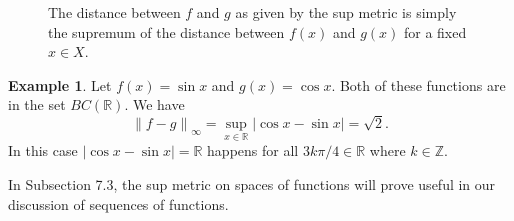 \documentclass{article}
\newcommand{\R}{\mathbb{R}}
\newcommand{\Z}{\mathbb{Z}}
\newcommand{\norm}[1]{\left\lVert#1\right\rVert}
\theoremstyle{definition}
\newtheorem{example}{Example}[section]
\begin{document}
	\begin{figure}[h!]
		\centering
		\caption{The distance between $ f $ and $ g $ as given by the sup metric is simply the supremum of the distance between $ f(x) $ and $ g(x) $ for a fixed $ x\in X $.}
	\end{figure}
	\begin{example}
		Let $ f(x)=\sin x $ and $ g(x)=\cos x $. Both of these functions are in the set $ BC(\R) $. We have $$\norm{f-g}_\infty=\sup_{x\in\R}|\cos x-\sin x|=\sqrt{2} .$$ In this case $ |\cos x-\sin x|=\R $ happens for all $ 3k\pi/4\in\R $ where $ k\in\Z $. 
	\end{example}
	
	In Subsection 7.3, the sup metric on spaces of functions will prove useful in our discussion of sequences of functions. 
\end{document}
